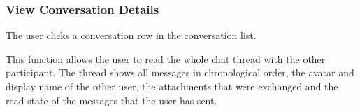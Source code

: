 
\subsubsection{View Conversation Details}

 The user clicks a conversation row in the conversation list.

 This function allows the user to read the whole chat thread with the other participant. The thread shows all messages in chronological order, the avatar and display name of the other user, the attachments that were exchanged and the read state of the messages that the user has sent.



